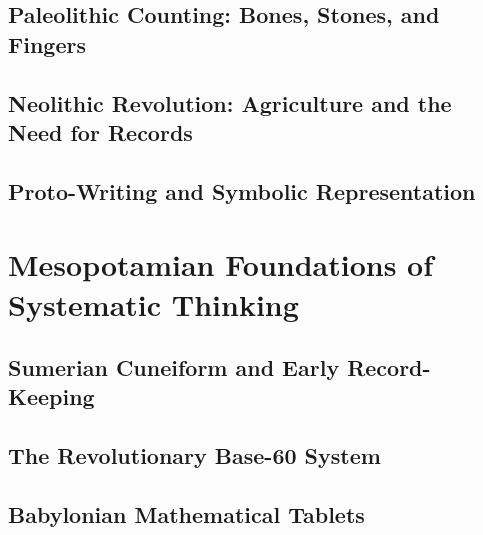 \documentclass[12pt, oneside, openany]{book}
\let\oldchapter\chapter
\renewcommand{\chapter}{
	\cleardoublepage
	\thispagestyle{chapter}
	\oldchapter
}
\begin{document}
\section{Paleolithic Counting: Bones, Stones, and Fingers}

\section{Neolithic Revolution: Agriculture and the Need for Records}

\section{Proto-Writing and Symbolic Representation}


\chapter{Mesopotamian Foundations of Systematic Thinking}

\section{Sumerian Cuneiform and Early Record-Keeping}

\section{The Revolutionary Base-60 System}

\section{Babylonian Mathematical Tablets}
\end{document}
